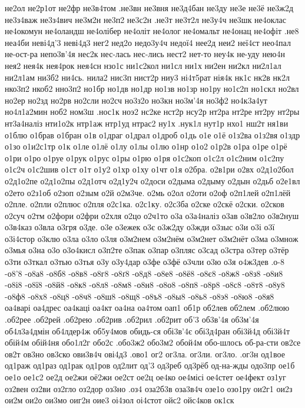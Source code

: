 {{не2ол
не2р1от
не2фр
не3в4том
.не3вн
не3вня
не3д4бан
не3ду
не3е
не3ё
не3ж2д
не3з4важ
не3з4вич
не3м2н
не3п2
не3с2н
.не3т
не3т2л
не3у4ч
не3шк
не4оклас
не4окомун
не4оландш
не4олібер
не4оліт
не4олог
не4омальт
не4онац
не4офіт
.не8
неа4би
неві4д'3
неві4д3
нег2
нед2о
недо3у4ч
недої4
нее2д
неи2
неї4ст
нео4пал
не-ост-ра
непо3в'4я
нес2к
нес-лась
нес-лись
нест2
нет-то
неу4к
не-уду
нею4н
нея2
нея4к
нея4рок
нея4сн
нзо1с
ни1с2кол
ни1сл
ни1х
ни2ен
ни2кл
ни2л1ал
ни2л1ам
ни3б2
ни4сь.
нила2
нис3п
нист2р
ниу3
ні4т5рат
нія4к
нк1с
нк2в
нк2л
нко3п2
нкоб2
нно3п2
но1бр
но1дв
но1др
но1зв
но1зр
но1ру
но1с2п
но1скл
но2вл
но2ер
но2зд
но2рв
но2сли
но2сч
но3з2о
но3кн
но3м'4я
но3ф2
но4к3а4ут
но4л1а2мин
ноб2
ном3ш
.нос1к
ноэ2
нс2ке
нст2р
нсу2р
нт2ра
нт2ре
нт2ру
нт2ры
нт3а4наліз
нти1о2к
нтр1аж
нтр1уд
нтрас2
ну1х
.нук1л
нут1р
нхо1
нш2т
ня1ви
о1блю
о1брав
о1бран
о1в
о1драг
о1драл
о1дроб
о1дь
о1е
о1ё
о1з2ва
о1з2вя
о1здр
о1зо
о1и2с1тр
о1к
о1ле
о1лё
о1лу
о1лы
о1лю
о1нр
о1о2
о1р2в
о1ра
о1ре
о1рё
о1ри
о1ро
о1руе
о1рук
о1рус
о1ры
о1рю
о1ря
о1с2коп
о1с2л
о1с2ним
о1с2пу
о1с2ч
о1с2шив
о1ст
о1т
о1у2
о1хр
о1ху
о1чт
о1я
о2бра.
о2в1ри
о2вх
о2д1о2бол
о2д1о2пе
о2д1о2пы
о2д1отч
о2д1у2ч
о2доси
о2дыма
о2дыму
о2дын
о2дьб
о2е1вл
о2ето
о2з1об
о2зоп
о2зым
о2й
о2м3че.
о2мь
о2ол
о2оти
о2оф
о2п1лей
о2п1лёй
о2пле.
о2пли
о2плюс
о2пля
о2с1ка.
о2с1ку.
о2с3ба
о2ске
о2скё
о2ски.
о2сков
о2суч
о2тм
о2фори
о2фри
о2хля
о2цо
о2ч1то
о3а
о3а4наліз
о3ав
о3в2ло
о3в2нуш
о3в4каз
о3вла
о3гря
о3де.
о3е
о3ежек
о3є
о3ж2ду
о3жди
о3зыс
о3и
о3і
о3ї
о3і4стор
о3клю
о3ла
о3ло
о3ля
о3м2нем
о3м2нём
о3м2нет
о3м2нёт
о3ма
о3множ
о3мья
о3на
о3о
о3о4кисл
о3п2те
о3пак
о3пар
о3пляс
о3сад
о3стра
о3тер
о3тёр
о3ти
о3ткал
о3тью
о3тья
о3у
о3у4дар
о3фе
о3фё
о3чли
о3ю
о3я
о4ж3дев
.о-8
-о8'8
-о8а8
-о8б8
-о8в8
-о8г8
-о8ґ8
-о8д8
-о8е8
-о8ё8
-о8є8
-о8ж8
-о8з8
-о8и8
-о8і8
-о8ї8
-о8й8
-о8к8
-о8л8
-о8м8
-о8н8
-о8о8
-о8п8
-о8р8
-о8с8
-о8т8
-о8у8
-о8ф8
-о8х8
-о8ц8
-о8ч8
-о8ш8
-о8щ8
-о8ъ8
-о8ы8
-о8ь8
-о8э8
-о8ю8
-о8я8
оа4варі
оа4дрес
оа4каці
оа4кт
оа4на
оа4том
оап1
об1р
об2лев
об2лем
.об2люю
.об2рее
.об2рей
.об2рею
.об2рив
.об2рил
.об2рит
об'3
об3в'4я
об3м'4я
об4л3а4дмін
об4лдер4ж
об5у4мов
обидь-ся
обі3в'4є
обі3д4ран
обі3й4д
обі3й4т
обій4м
обій4ня
обо1л2г
обо2с
.обо3ж2
обо3м2
обой4м
обо-шлось
об-ра-сти
ов2се
ов2т
ов3но
ов3ско
ови3в4ч
ові4д3
.ово1
ог2
ог3ла.
ог3ли.
ог3ло.
.ог3н
од1вое
од1раж
од1раз
од1рак
од1ров
од2лит
од'3
од3реб
од3рёб
од-на-жды
одо3пр
ое1б
ое1о
ое1с2
ое2д
ое2жи
оё2жи
ое2ст
ое2ц
ое4ко
ое4місі
ое4стет
ое4фект
оз1уг
оз2вен
оз2ви
оз2гло
оз2дор
оз3но
.оз4
оза2б3в
оза3в4ч
озе1о
озо1ру
ои2г1
ои2з
ои2м
ои2о
ои3мо
оиг2н
оие3
оі4зол
оі4стот
ойс2
ойс4ков
ок1ск
}}
